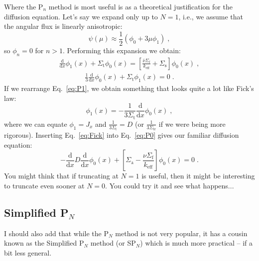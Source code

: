 \documentclass{article}
\begin{document}
Where the P$_n$ method is most useful is as a theoretical justification for the diffusion equation. Let's say we expand only up to $N=1$, i.e., we assume that the angular flux is linearly anisotropic:
\begin{equation}
    \psi(\mu) \approx \frac{1}{2}\left(\phi_0 + 3\mu \phi_1\right)\;\mathrm{,}
\end{equation}
so $\phi_n = 0$ for $n>1$. Performing this expansion we obtain:
\begin{equation} \label{eq:P0}
    \begin{split}
 \frac{\mathrm{d}}{\mathrm{d}x}\phi_1(x) + \Sigma_\mathrm{t}\phi_0(x)
    =\left[\frac{\bar{\nu}\Sigma_\mathrm{f}}{ k_\mathrm{eff}} + \Sigma_\mathrm{s}\right]\phi_0(x)\;\mathrm{,}
    \end{split}
\end{equation}
\begin{equation}\label{eq:P1}
    \begin{split}
 \frac{1}{3}\frac{\mathrm{d}}{\mathrm{d}x}\phi_0(x) + \Sigma_\mathrm{t}\phi_1(x)
    =0\;\mathrm{.}
    \end{split}
\end{equation}
If we rearrange Eq.~\eqref{eq:P1}, we obtain something that looks quite a lot like Fick's law:
\begin{equation}\label{eq:Fick}
    \phi_1(x) = -\frac{1}{3\Sigma_\mathrm{t}}\frac{\mathrm{d}}{\mathrm{d}x}\phi_0(x)\;\mathrm{,}
\end{equation}
where we can equate $\phi_1 = J_x$ and $\frac{1}{3\Sigma_\mathrm{t}}=D$ (or $\frac{1}{3\Sigma_\mathrm{tr}}$ if we were being more rigorous). 
 Inserting Eq.~\eqref{eq:Fick} into Eq.~\eqref{eq:P0} gives our familiar diffusion equation:
\begin{equation}
    -\frac{\mathrm{d}}{\mathrm{d}x}D\frac{\mathrm{d}}{\mathrm{d}x}\phi_0(x) + \left[\Sigma_\mathrm{a} - \frac{\nu\Sigma_\mathrm{f}}{k_\mathrm{eff}}\right]\phi_0(x) = 0\;\mathrm{.}
\end{equation}
You might think that if truncating at $N=1$ is useful, then it might be interesting to truncate even sooner at $N=0$. You could try it and see what happens...

\subsection{Simplified P$_N$}
I should also add that while the P$_N$ method is not very popular, it has a cousin known as the Simplified P$_N$ method (or SP$_N$) which is much more practical -- if a bit less general. 
\end{document}
